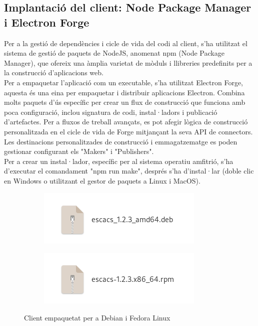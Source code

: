 \subsection{Implantació del client: Node Package Manager i Electron Forge}
Per a la gestió de dependències i cicle de vida del codi al client, s'ha utilitzat el sistema de gestió de paquets de NodeJS, anomenat npm (Node Package Manager), que ofereix una àmplia varietat de mòduls i llibreries predefinits per a la construcció d'aplicacions web.
\\[3mm]
Per a empaquetar l'aplicació com un executable, s'ha utilitzat Electron Forge, aquesta és una eina per empaquetar i distribuir aplicacions Electron. Combina molts paquets d'ús específic per crear un flux de construcció que funciona amb poca configuració, inclou signatura de codi, instal·ladors i publicació d'artefactes. Per a fluxos de treball avançats, es pot afegir lògica de construcció personalitzada en el cicle de vida de Forge mitjançant la seva API de connectors. Les destinacions personalitzades de construcció i emmagatzematge es poden gestionar configurant els "Makers" i "Publishers".
\\[3mm]
Per a crear un instal·lador, específic per al sistema operatiu amfitrió, s'ha d'executar el comandament "npm run make", després s'ha d'instal·lar (doble clic en Windows o utilitzant el gestor de paquets a Linux i MacOS).
\begin{figure}[H]
     \centering
     \begin{subfigure}[b]{0.4\textwidth}
         \centering
         \includegraphics[width=\textwidth]{images/npm-make-deb.png}
         \label{fig:Alfil}
     \end{subfigure}
     \hspace{0.15\textwidth}
     \begin{subfigure}[b]{0.4\textwidth}
         \centering
         \includegraphics[width=\textwidth]{images/npm-make-rpm.png}
         \label{fig:Rei}
     \end{subfigure}
        \caption{Client empaquetat per a Debian i Fedora Linux}
        \label{fig:Desplaçament vectorial i no vectorial}
\end{figure}